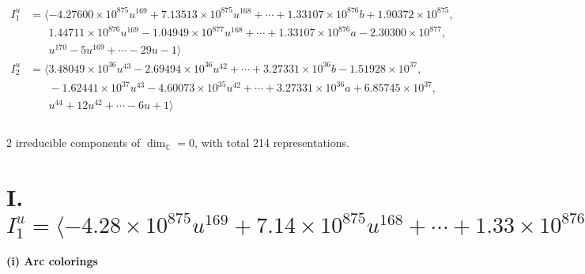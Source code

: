 \documentclass[1p]{elsarticle_modified}
\theoremstyle{definition}
\begin{document}
\begin{align*}
I^u_{1}&=\langle 
-4.27600\times10^{875} u^{169}+7.13513\times10^{875} u^{168}+\cdots+1.33107\times10^{876} b+1.90372\times10^{875},\\
\phantom{I^u_{1}}&\phantom{= \langle  }1.44711\times10^{876} u^{169}-1.04949\times10^{877} u^{168}+\cdots+1.33107\times10^{876} a-2.30300\times10^{877},\\
\phantom{I^u_{1}}&\phantom{= \langle  }u^{170}-5 u^{169}+\cdots-29 u-1\rangle \\
I^u_{2}&=\langle 
3.48049\times10^{36} u^{43}-2.69494\times10^{36} u^{42}+\cdots+3.27331\times10^{36} b-1.51928\times10^{37},\\
\phantom{I^u_{2}}&\phantom{= \langle  }-1.62441\times10^{37} u^{43}-4.60073\times10^{35} u^{42}+\cdots+3.27331\times10^{36} a+6.85745\times10^{37},\\
\phantom{I^u_{2}}&\phantom{= \langle  }u^{44}+12 u^{42}+\cdots-6 u+1\rangle \\
\\
\end{align*}
\raggedright * 2 irreducible components of $\dim_{\mathbb{C}}=0$, with total 214 representations.\\
\newpage
\renewcommand{\arraystretch}{1}
\centering \section*{I. $I^u_{1}= \langle -4.28\times10^{875} u^{169}+7.14\times10^{875} u^{168}+\cdots+1.33\times10^{876} b+1.90\times10^{875},\;1.45\times10^{876} u^{169}-1.05\times10^{877} u^{168}+\cdots+1.33\times10^{876} a-2.30\times10^{877},\;u^{170}-5 u^{169}+\cdots-29 u-1 \rangle$}
\flushleft \textbf{(i) Arc colorings}\\
\end{document}
